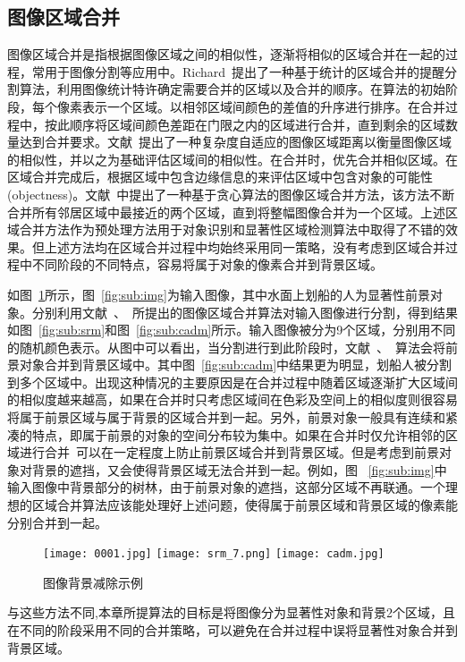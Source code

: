 \subsection{图像区域合并}
\label{sec:regionMerging}
图像区域合并是指根据图像区域之间的相似性，逐渐将相似的区域合并在一起的过程，常用于图像分割等应用中。Richard~\cite{Richard2004Statistical}提出了一种基于统计的区域合并的提醒分割算法，利用图像统计特许确定需要合并的区域以及合并的顺序。在算法的初始阶段，每个像素表示一个区域。以相邻区域间颜色的差值的升序进行排序。在合并过程中，按此顺序将区域间颜色差距在门限之内的区域进行合并，直到剩余的区域数量达到合并要求。文献~提出了一种复杂度自适应的图像区域距离以衡量图像区域的相似性，并以之为基础评估区域间的相似性。在合并时，优先合并相似区域。在区域合并完成后，根据区域中包含边缘信息的来评估区域中包含对象的可能性(objectness)。文献~中提出了一种基于贪心算法的图像区域合并方法，该方法不断合并所有邻居区域中最接近的两个区域，直到将整幅图像合并为一个区域。上述区域合并方法作为预处理方法用于对象识别和显著性区域检测算法中取得了不错的效果。但上述方法均在区域合并过程中均始终采用同一策略，没有考虑到区域合并过程中不同阶段的不同特点，容易将属于对象的像素合并到背景区域。\par
如图~\ref{fig:rm}所示，图~\ref{fig:sub:img}为输入图像，其中水面上划船的人为显著性前景对象。分别利用文献~、~所提出的图像区域合并算法对输入图像进行分割，得到结果如图~\ref{fig:sub:srm}和图~\ref{fig:sub:cadm}所示。输入图像被分为9个区域，分别用不同的随机颜色表示。从图中可以看出，当分割进行到此阶段时，文献~、~算法会将前景对象合并到背景区域中。其中图~\ref{fig:sub:cadm}中结果更为明显，划船人被分割到多个区域中。出现这种情况的主要原因是在合并过程中随着区域逐渐扩大区域间的相似度越来越高，如果在合并时只考虑区域间在色彩及空间上的相似度则很容易将属于前景区域与属于背景的区域合并到一起。另外，前景对象一般具有连续和紧凑的特点，即属于前景的对象的空间分布较为集中。如果在合并时仅允许相邻的区域进行合并~\cite{SelectiveSearch}可以在一定程度上防止前景区域合并到背景区域。但是考虑到前景对象对背景的遮挡，又会使得背景区域无法合并到一起。例如，图 ~\ref{fig:sub:img}中输入图像中背景部分的树林，由于前景对象的遮挡，这部分区域不再联通。一个理想的区域合并算法应该能处理好上述问题，使得属于前景区域和背景区域的像素能分别合并到一起。
\begin{figure}[htb]
  \centering%
    {\texttt{[image: 0001.jpg]}}%
 \hspace{1em}%
      {\texttt{[image: srm\_7.png]}}
 \hspace{1em}
      {\texttt{[image: cadm.jpg]}}
  \caption{图像背景减除示例}
  \label{fig:rm}
\end{figure}
与这些方法不同,本章所提算法的目标是将图像分为显著性对象和背景2个区域，且在不同的阶段采用不同的合并策略，可以避免在合并过程中误将显著性对象合并到背景区域。

